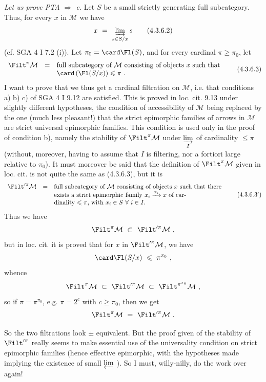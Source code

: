 \noindent\textit{Let us prove PTA $\Longrightarrow$ c.} Let $S$ be a small strictly generating full subcategory. Thus, for every $x$ in $\mathcal M$ we have
\[
x\ =\ \varinjlim_{s\in S/x}s
\tag*{(4.3.6.2)}
\]
(cf. SGA 4 I 7.2 (i)). Let $\pi_0=\card\Fl(S)$, and for every cardinal $\pi\geqslant\pi_0$, let
\[
\begin{array}{lcl}
\Filt^\pi\mathcal M & = & \text{full subcategory of $\mathcal M$ consisting of objects $x$ such that}\\
 & & \card\,(\Fl(S/x))\leqslant\pi\ .
\end{array}
\tag*{(4.3.6.3)}
\]
I want to prove that we thus get a cardinal filtration on $\mathcal M$, i.e. that conditions a) b) c) of SGA 4 I 9.12 are satisfied. This is proved in loc. cit. 9.13 under slightly different hypotheses, the condition of accessibility of $\mathcal M$ being replaced by the one (much less pleasant!) that the strict epimorphic families of arrows in $\mathcal M$ are strict universal epimorphic families. This condition is used only in the proof of condition b), namely the stability of $\Filt^\pi\mathcal M$ under $\varinjlim\limits_I$ of cardinality $\leqslant\pi$ (without, moreover, having to assume that $I$ is filtering, nor a fortiori large relative to $\pi_0$). It must moreover be said that the definition of $\Filt^\pi\mathcal M$ given in loc. cit. is not quite the same as (4.3.6.3), but it is
\[
\begin{array}{lcl}
\Filt'^{\pi}\mathcal M & = & \text{full subcategory of $\mathcal M$ consisting of objects $x$ such that there}\\
 & & \text{exists a strict epimorphic family $x_i\xrightarrow{\alpha_i}x$ of car-}\\
 & & \text{dinality $\leqslant\pi$, with $x_i\in S\ \forall\ i\in I$.}
\end{array}
\tag*{(4.3.6.3$'$)}
\]
Thus we have
\[
\Filt^\pi\mathcal M\ \subset\ \Filt'^{\pi}\mathcal M\ ,
\]
but in loc. cit. it is proved that for $x$ in $\Filt'^{\pi}\mathcal M$, we have
\[
\card\Fl(S/x)\ \leqslant\ \pi^{\pi_0}\ ,
\]
whence
\[
\Filt^\pi\mathcal M\ \subset\ \Filt'^{\pi}\mathcal M\ \subset\ \Filt^{\pi^{\pi_0}}\mathcal M\ ,
\]
so if $\pi=\pi^{\pi_0}$, e.g. $\pi=2^c$ with $c\geqslant\pi_0$, then we get
\[
\Filt^\pi\mathcal M\ =\ \Filt'^{\pi}\mathcal M\ .
\]

\noindent So the two filtrations look $\pm$ equivalent. But the proof given of the stability of $\Filt'^{\pi}$ really seems to make essential use of the universality condition on strict epimorphic families (hence effective epimorphic, with the hypotheses made implying the existence of small $\varprojlim$ ). So I must, willy-nilly, do the work over again! %

